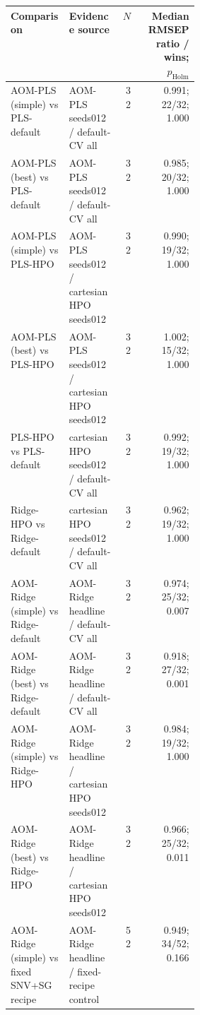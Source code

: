 \begin{tabularx}{\linewidth}{p{0.31\linewidth}Xrr}
\toprule
Comparison & Evidence source & $N$ & Median RMSEP ratio / wins; $p_{\mathrm{Holm}}$ \\
\midrule
AOM-\allowbreak{}PLS (simple) vs PLS-\allowbreak{}default & AOM-\allowbreak{}PLS seeds012 /\allowbreak{} default-\allowbreak{}CV all & 32 & 0.991; 22/32; 1.000 \\
AOM-\allowbreak{}PLS (best) vs PLS-\allowbreak{}default & AOM-\allowbreak{}PLS seeds012 /\allowbreak{} default-\allowbreak{}CV all & 32 & 0.985; 20/32; 1.000 \\
AOM-\allowbreak{}PLS (simple) vs PLS-\allowbreak{}HPO & AOM-\allowbreak{}PLS seeds012 /\allowbreak{} cartesian HPO seeds012 & 32 & 0.990; 19/32; 1.000 \\
AOM-\allowbreak{}PLS (best) vs PLS-\allowbreak{}HPO & AOM-\allowbreak{}PLS seeds012 /\allowbreak{} cartesian HPO seeds012 & 32 & 1.002; 15/32; 1.000 \\
PLS-\allowbreak{}HPO vs PLS-\allowbreak{}default & cartesian HPO seeds012 /\allowbreak{} default-\allowbreak{}CV all & 32 & 0.992; 19/32; 1.000 \\
Ridge-\allowbreak{}HPO vs Ridge-\allowbreak{}default & cartesian HPO seeds012 /\allowbreak{} default-\allowbreak{}CV all & 32 & 0.962; 19/32; 1.000 \\
AOM-\allowbreak{}Ridge (simple) vs Ridge-\allowbreak{}default & AOM-\allowbreak{}Ridge headline /\allowbreak{} default-\allowbreak{}CV all & 32 & 0.974; 25/32; 0.007 \\
AOM-\allowbreak{}Ridge (best) vs Ridge-\allowbreak{}default & AOM-\allowbreak{}Ridge headline /\allowbreak{} default-\allowbreak{}CV all & 32 & 0.918; 27/32; 0.001 \\
AOM-\allowbreak{}Ridge (simple) vs Ridge-\allowbreak{}HPO & AOM-\allowbreak{}Ridge headline /\allowbreak{} cartesian HPO seeds012 & 32 & 0.984; 19/32; 1.000 \\
AOM-\allowbreak{}Ridge (best) vs Ridge-\allowbreak{}HPO & AOM-\allowbreak{}Ridge headline /\allowbreak{} cartesian HPO seeds012 & 32 & 0.966; 25/32; 0.011 \\
AOM-\allowbreak{}Ridge (simple) vs fixed SNV+SG recipe & AOM-\allowbreak{}Ridge headline /\allowbreak{} fixed-\allowbreak{}recipe control & 52 & 0.949; 34/52; 0.166 \\
\bottomrule
\end{tabularx}
